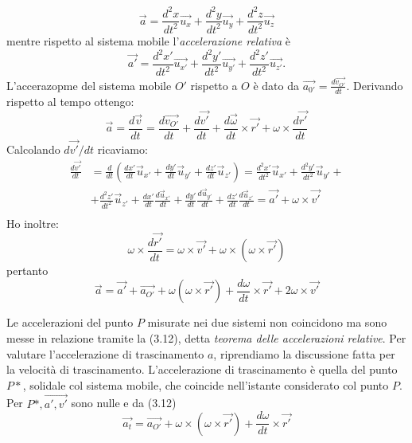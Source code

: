 \documentclass[class=book, crop=false, oneside, 12pt]{standalone}
\begin{document}
\begin{equation}
    \overrightarrow{a} = \frac{d^2 x }{dt^2} \overrightarrow{u_x} + \frac{d^2 y }{dt^2} \overrightarrow{u_y} + \frac{d^2 z }{dt^2} \overrightarrow{u_z}
\end{equation}
mentre rispetto al sistema mobile l'\emph{accelerazione relativa} è
\begin{equation}
    \overrightarrow{a'} = \frac{d^2 x' }{dt^2} \overrightarrow{u_{x'}} + \frac{d^2 y' }{dt^2} \overrightarrow{u_{y'}} + \frac{d^2 z' }{dt^2} \overrightarrow{u_{z'}} . 
\end{equation}
L'accerazopme del sistema mobile \(O'\) rispetto a \(O\) è dato da \(\overrightarrow{a_{0'}} = \frac{d \overrightarrow{v_{O'}}}{dt}\). Derivando rispetto al tempo ottengo:
\begin{equation}
    \overrightarrow{a} = \frac{d \overrightarrow{v}}{dt} = \frac{d \overrightarrow{v_{O'}}}{dt} + \frac{d \overrightarrow{v'}}{dt} + \frac{d \overrightarrow{\omega}}{dt} \times \overrightarrow{r'} + \omega \times \frac{d \overrightarrow{r'}}{dt}
\end{equation}
Calcolando \(d \overrightarrow{v'} / dt\) ricaviamo:
\begin{align*}
    \frac{d \overrightarrow{v'}}{d t} &=\frac{d}{d t}( \frac{d x'}{d t} \overrightarrow{u}_{x'}+\frac{d y'}{d t} \overrightarrow{u}_{y'}+\frac{d z'}{d t} \overrightarrow{u}_{z'})=\frac{d^{2} x'}{d t^{2}} \overrightarrow{u}_{x'}+\frac{d^{2} y'}{d t^{2}} \overrightarrow{u}_{y'} +\\
    &+ \frac{d^{2} z'}{d t^{2}} \overrightarrow{u}_{z'}+\frac{d x'}{d t} \frac{d \overrightarrow{u}_{x'}}{d t}+\frac{d y'}{d t} \frac{d \overrightarrow{u}_{y'}}{d t}+\frac{d z'}{d t} \frac{d \overrightarrow{u}_{z'}}{d t}=\overrightarrow{a'}+\omega \times \overrightarrow{v'}\\
\end{align*}
Ho inoltre:
\begin{equation*}
    \omega \times \frac{d \overrightarrow{r'}}{dt} = \omega \times \overrightarrow{v'} + \omega \times ( \omega \times \overrightarrow{r'})
\end{equation*}
pertanto
\begin{equation}
    \overrightarrow{a} = \overrightarrow{a'} + \overrightarrow{a_{O'}} + \omega ( \omega \times \overrightarrow{r'}) + \frac{d \omega}{dt} \times \overrightarrow{r'} + 2 \omega \times \overrightarrow{v'}
\end{equation}

Le accelerazioni del punto \(P\) misurate nei due sistemi non coincidono ma sono messe in relazione tramite la (3.12), detta \emph{teorema delle accelerazioni relative}.
Per valutare l'accelerazione di trascinamento \(a\), riprendiamo la discussione fatta per la velocità di trascinamento. 
L'accelerazione di trascinamento è quella del punto \(P*\), solidale col sistema mobile, che coincide nell'istante considerato col punto \(P\). 
Per \(P*, \overrightarrow{a', v'}\) sono nulle e da (3.12)
\begin{equation}
    \overrightarrow{a_t} = \overrightarrow{a_{O'}} + \omega \times (\omega \times \overrightarrow{r'}) + \frac{d \omega }{dt} \times \overrightarrow{r'}
\end{equation}
\end{document}
